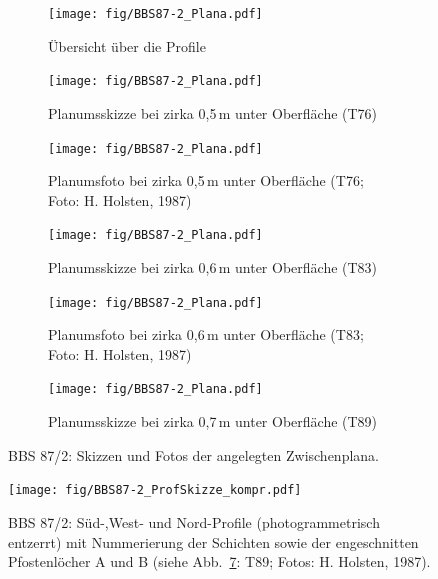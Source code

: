 \begin{figure}[p]
	\centering
	\begin{subfigure}[t]{.75\textwidth}
		\texttt{[image: fig/BBS87-2\_Plana.pdf]}
		\caption{Übersicht über die Profile}
		\label{fig:BBS87-2_SkizzeUebersicht}
	\end{subfigure}
	\begin{subfigure}[t]{.75\columnwidth}
		\texttt{[image: fig/BBS87-2\_Plana.pdf]}
		\caption{Planumsskizze bei zirka 0,5\,m unter Oberfläche (T76)}
		\label{fig:BBS87-2_T76Skizze}
	\end{subfigure}\hspace{1em}
	\begin{subfigure}[t]{.75\columnwidth}
		\texttt{[image: fig/BBS87-2\_Plana.pdf]}
		\caption{Planumsfoto bei zirka 0,5\,m unter Oberfläche (T76; Foto: H. Holsten, 1987)}
		\label{fig:BBS87-2_T76Foto}
		\end{subfigure}
	\begin{subfigure}[t]{.75\columnwidth}
		\texttt{[image: fig/BBS87-2\_Plana.pdf]}
		\caption{Planumsskizze bei zirka 0,6\,m unter Oberfläche (T83)}
		\label{fig:BBS87-2_T83Skizze}
		\end{subfigure}\hspace{1em}
	\begin{subfigure}[t]{.75\columnwidth}
		\texttt{[image: fig/BBS87-2\_Plana.pdf]}
		\caption{Planumsfoto bei zirka 0,6\,m unter Oberfläche (T83; Foto: H. Holsten, 1987)}
		\label{fig:BBS87-2_T83Foto}
		\end{subfigure}
	\begin{subfigure}[t]{.75\columnwidth}
		\texttt{[image: fig/BBS87-2\_Plana.pdf]}
		\caption{Planumsskizze bei zirka 0,7\,m unter Oberfläche (T89)}
		\label{fig:BBS87-2_T89Skizze}
		\end{subfigure}\hspace{1em}
	\begin{subfigure}[t]{.75\columnwidth}
		\mbox{}
	\end{subfigure}
	\caption{BBS 87/2: Skizzen und Fotos der angelegten Zwischenplana.}
	\label{fig:BBS87-2_Plana_Foto+Skizzen}
\end{figure}

\begin{figure}
	\centering
	\vspace{8cm}
	\begin{minipage}[t]{\textwidth}
		\texttt{[image: fig/BBS87-2\_ProfSkizze\_kompr.pdf]}
		\caption{BBS 87/2: Süd-,West- und Nord-Profile (photogrammetrisch entzerrt) mit Nummerierung der Schichten sowie der engeschnitten Pfostenlöcher A und B (siehe Abb.~\ref{fig:BBS87-2_Plana_Foto+Skizzen}: T89; Fotos: H. Holsten, 1987).}
		\label{fig:BBS87-2_Profile}
	\end{minipage}
\end{figure}

